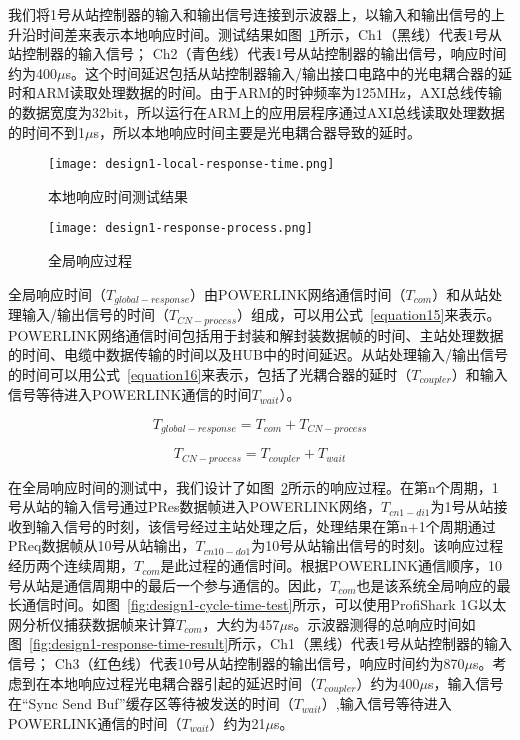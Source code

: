 我们将1号从站控制器的输入和输出信号连接到示波器上，以输入和输出信号的上升沿时间差来表示本地响应时间。测试结果如图~\ref{fig:design1-local-response-time}所示，Ch1（黑线）代表1号从站控制器的输入信号； Ch2（青色线）代表1号从站控制器的输出信号，响应时间约为400$\mu$s。这个时间延迟包括从站控制器输入/输出接口电路中的光电耦合器的延时和ARM读取处理数据的时间。由于ARM的时钟频率为125MHz，AXI总线传输的数据宽度为32bit，所以运行在ARM上的应用层程序通过AXI总线读取处理数据的时间不到1$\mu$s，所以本地响应时间主要是光电耦合器导致的延时。

\begin{figure}[!htb]
	\centering
	\texttt{[image: design1-local-response-time.png]}
	\caption{本地响应时间测试结果}
	\label{fig:design1-local-response-time}
\end{figure}

\begin{figure}[!htb]
  \centering
  \texttt{[image: design1-response-process.png]}
  \caption{全局响应过程}
  \label{fig:design1-response-process}
\end{figure}

全局响应时间（$T_{global-response}$）由POWERLINK网络通信时间（$T_{com}$）和从站处理输入/输出信号的时间（$T_{CN-process}$）组成，可以用公式~\ref{equation15}来表示。POWERLINK网络通信时间包括用于封装和解封装数据帧的时间、主站处理数据的时间、电缆中数据传输的时间以及HUB中的时间延迟。从站处理输入/输出信号的时间可以用公式~\ref{equation16}来表示，包括了光耦合器的延时（$T_{coupler}$）和输入信号等待进入POWERLINK通信的时间$T_{wait}$）。

\begin{equation}
\label{equation15}
T_{global-response}=T_{com}+T_{CN-process}
\end{equation}

\begin{equation}
\label{equation16}
T_{CN-process}=T_{coupler}+T_{wait}
\end{equation}

在全局响应时间的测试中，我们设计了如图~\ref{fig:design1-response-process}所示的响应过程。在第n个周期，1号从站的输入信号通过PRes数据帧进入POWERLINK网络，$T_{cn1-di1}$为1号从站接收到输入信号的时刻，该信号经过主站处理之后，处理结果在第n+1个周期通过PReq数据帧从10号从站输出，$T_{cn10-do1}$为10号从站输出信号的时刻。该响应过程经历两个连续周期，$T_{com}$是此过程的通信时间。根据POWERLINK通信顺序，10号从站是通信周期中的最后一个参与通信的。因此，$T_{com}$也是该系统全局响应的最长通信时间。如图~\ref{fig:design1-cycle-time-test}所示，可以使用ProfiShark 1G以太网分析仪捕获数据帧来计算$T_{com}$，大约为457$\mu$s。示波器测得的总响应时间如图~\ref{fig:design1-response-time-result}所示，Ch1（黑线）代表1号从站控制器的输入信号； Ch3（红色线）代表10号从站控制器的输出信号，响应时间约为870$\mu$s。考虑到在本地响应过程光电耦合器引起的延迟时间（$T_{coupler}$）约为400$\mu$s，输入信号在“Sync Send Buf”缓存区等待被发送的时间（$T_{wait}$）,输入信号等待进入POWERLINK通信的时间（$T_{wait}$）约为21$\mu$s。

